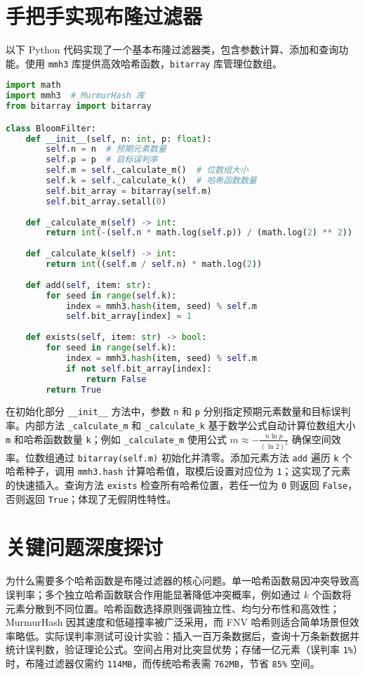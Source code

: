 \chapter{手把手实现布隆过滤器}
以下 Python 代码实现了一个基本布隆过滤器类，包含参数计算、添加和查询功能。使用 \verb!mmh3! 库提供高效哈希函数，\verb!bitarray! 库管理位数组。\par
\begin{lstlisting}[language=python]
import math
import mmh3  # MurmurHash 库
from bitarray import bitarray

class BloomFilter:
    def __init__(self, n: int, p: float):
        self.n = n  # 预期元素数量
        self.p = p  # 目标误判率
        self.m = self._calculate_m()  # 位数组大小
        self.k = self._calculate_k()  # 哈希函数数量
        self.bit_array = bitarray(self.m)
        self.bit_array.setall(0)
    
    def _calculate_m(self) -> int:
        return int(-(self.n * math.log(self.p)) / (math.log(2) ** 2))
    
    def _calculate_k(self) -> int:
        return int((self.m / self.n) * math.log(2))
    
    def add(self, item: str):
        for seed in range(self.k):
            index = mmh3.hash(item, seed) % self.m
            self.bit_array[index] = 1
    
    def exists(self, item: str) -> bool:
        for seed in range(self.k):
            index = mmh3.hash(item, seed) % self.m
            if not self.bit_array[index]:
                return False
        return True
\end{lstlisting}
在初始化部分 \verb!__init__! 方法中，参数 \verb!n! 和 \verb!p! 分别指定预期元素数量和目标误判率。内部方法 \verb!_calculate_m! 和 \verb!_calculate_k! 基于数学公式自动计算位数组大小 \verb!m! 和哈希函数数量 \verb!k!；例如 \verb!_calculate_m! 使用公式 $m \approx -\frac{n \ln p}{(\ln 2)^2}$ 确保空间效率。位数组通过 \verb!bitarray(self.m)! 初始化并清零。添加元素方法 \verb!add! 遍历 \verb!k! 个哈希种子，调用 \verb!mmh3.hash! 计算哈希值，取模后设置对应位为 \verb!1!；这实现了元素的快速插入。查询方法 \verb!exists! 检查所有哈希位置，若任一位为 \verb!0! 则返回 \verb!False!，否则返回 \verb!True!；体现了无假阴性特性。\par
\chapter{关键问题深度探讨}
为什么需要多个哈希函数是布隆过滤器的核心问题。单一哈希函数易因冲突导致高误判率；多个独立哈希函数联合作用能显著降低冲突概率，例如通过 $k$ 个函数将元素分散到不同位置。哈希函数选择原则强调独立性、均匀分布性和高效性；MurmurHash 因其速度和低碰撞率被广泛采用，而 FNV 哈希则适合简单场景但效率略低。实际误判率测试可设计实验：插入一百万条数据后，查询十万条新数据并统计误判数，验证理论公式。空间占用对比突显优势；存储一亿元素（误判率 \verb!1%!）时，布隆过滤器仅需约 \verb!114MB!，而传统哈希表需 \verb!762MB!，节省 \verb!85%! 空间。\par
